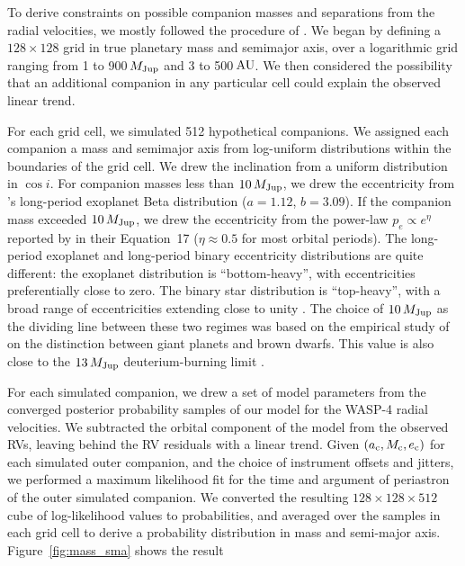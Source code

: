 \documentclass[12pt,twocolumn,tighten,trackchanges]{aastex62}
\begin{document}
To derive constraints on possible companion masses and separations
from the radial velocities, we mostly followed the procedure of
\citet{bryan_excess_2019}. We began by defining a $128\times128$ grid
in true planetary mass and semimajor axis, over a logarithmic grid
ranging from 1 to 900$\,$$M_{\rm Jup}$ and 3 to 500$\,$${\rm AU}$.  We
then considered the possibility that an additional companion in any
particular cell could explain the observed linear trend.

For each grid cell, we simulated 512 hypothetical companions. We
assigned each companion a mass and semimajor axis from log-uniform
distributions within the boundaries of the grid cell. We drew the
inclination from a uniform distribution in $\cos i$.  For companion
masses less than $10\,M_{\rm Jup}$, we drew the eccentricity from
\citet{kipping_beta_2013}'s long-period exoplanet Beta distribution
($a=1.12$, $b=3.09$).  If the companion mass exceeded $10\,M_{\rm
Jup}$, we drew the eccentricity from the power-law $p_e \propto
e^\eta$ reported by \citet{moe_mind_2017} in their Equation~17 ($\eta
\approx 0.5$ for most orbital periods).  The long-period exoplanet and
long-period binary eccentricity distributions are quite different: the
exoplanet distribution is ``bottom-heavy'', with eccentricities
preferentially close to zero.  The binary star distribution is
``top-heavy'', with a broad range of eccentricities extending close to
unity \citep{moe_mind_2017,price-whelan_close_2020}.  The choice of
$10\,M_{\rm Jup}$ as the dividing line between these two regimes was
based on the empirical study of \citet{schlaufman_evidence_2018} on
the distinction between giant planets and brown dwarfs. This value is
also close to the $13\,M_{\rm Jup}$ deuterium-burning limit
\citep[{\it e.g.},][]{burrows_nongray_1997}.

For each simulated companion, we drew a set of model parameters from
the converged posterior probability samples of our model for the
WASP-4 radial velocities.  We subtracted the orbital component of the
model from the observed RVs, leaving behind the RV residuals with a
linear trend.  Given $(a_{\rm c}, M_{\rm c}, e_{\rm c})$ for each
simulated outer companion, and the choice of instrument offsets and
jitters, we performed a maximum likelihood fit for the time and
argument of periastron of the outer simulated companion.  We converted
the resulting $128\times128\times512$ cube of log-likelihood values to
probabilities, and averaged over the samples in each grid cell to
derive a probability distribution in mass and semi-major axis.
Figure~\ref{fig:mass_sma} shows the result
\end{document}

